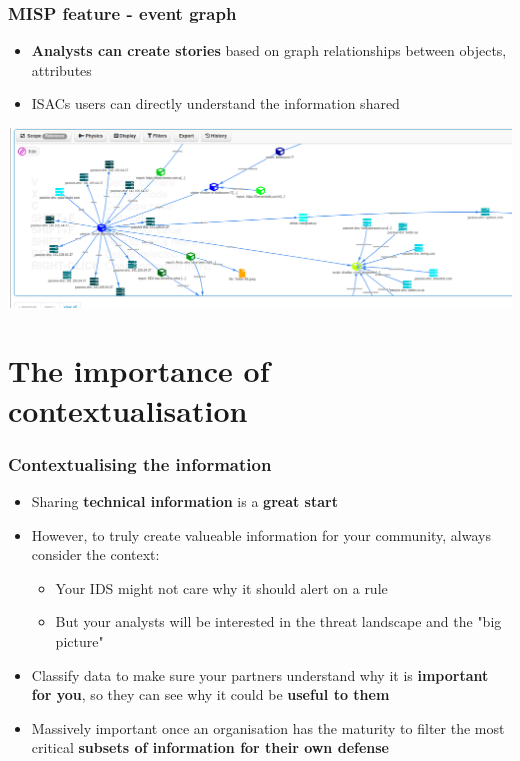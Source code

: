 \begin{frame}
    \frametitle{MISP feature - event graph}
    \begin{itemize}
        \item \textbf{Analysts can create stories} based on graph relationships between objects, attributes
         \item ISACs users can directly understand the information shared
    \end{itemize}
    \includegraphics[scale=0.20]{../images/event-graph.png}
\end{frame}

\section{The importance of \\ contextualisation}

\begin{frame}
\frametitle{Contextualising the information}
\begin{itemize}
    \item Sharing \textbf{technical information} is a \textbf{great start}
	\item However, to truly create valueable information for your community, always consider the context:
	\begin{itemize}
		\item Your IDS might not care why it should alert on a rule
		\item But your analysts will be interested in the threat landscape and the "big picture"
	\end{itemize}
    \item Classify data to make sure your partners understand why it is \textbf{important for you}, so they can see why it could be \textbf{useful to them}
    \item Massively important once an organisation has the maturity to filter the most critical \textbf{subsets of information for their own defense}
\end{itemize}
\end{frame}

